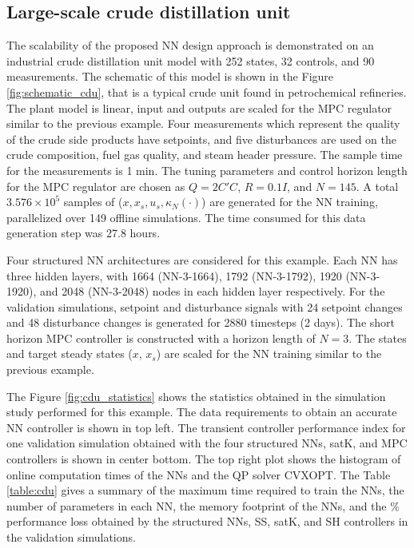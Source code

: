 \documentclass[preprint,5p, twocolumn, authoryear]{elsarticle}
\begin{document}
\subsection{Large-scale crude distillation unit}

The scalability of the proposed NN design 
approach is demonstrated on an industrial crude 
distillation unit model \citep*{pannocchia:rawlings:wright:2007} 
with 252 states, 32 controls, and 90 measurements. The 
schematic of this model is shown in the Figure \ref{fig:schematic_cdu}, 
that is a typical crude unit found in petrochemical refineries.
The plant model is linear, input and outputs are scaled 
for the MPC regulator similar to the previous example.
Four measurements which represent 
the quality of the crude side products have setpoints, 
and five disturbances are used on the crude composition, 
fuel gas quality, and steam header pressure. 
The sample time for the measurements is 1 min. The tuning 
parameters and control horizon length for the 
MPC regulator are chosen as $Q = 2C'C$, $R = 0.1I$, 
and $N = 145$. A total $3.576 \times 10^5$ 
samples of ($x, x_s, u_s, \kappa_N(\cdot)$)
are generated for the NN training, parallelized over 
149 offline simulations. The time consumed 
for this data generation step was 27.8 hours.

Four structured NN architectures 
are considered for this example. Each NN
has three hidden layers, with 
1664 (NN-3-1664), 1792 (NN-3-1792), 
1920 (NN-3-1920), and 2048 (NN-3-2048) 
nodes in each hidden layer respectively. 
For the validation simulations, 
setpoint and disturbance signals 
with 24 setpoint changes and 48 disturbance changes 
is generated for 2880 timesteps (2 days). 
The short horizon MPC controller is constructed with a 
horizon length of $N = 3$. 
The states and target steady states 
($x$, $x_s$) are scaled for the NN training
similar to the previous example.

The Figure \ref{fig:cdu_statistics} shows the 
statistics obtained in the simulation study performed for this 
example. The data requirements to obtain 
an accurate NN controller is shown in top left.
The transient controller performance index 
for one validation simulation
obtained with the four structured NNs,
satK, and MPC controllers is shown in center bottom.
The top right plot shows the 
histogram of online computation times 
of the NNs and the QP solver CVXOPT.
The Table \ref{table:cdu} gives a summary of 
the maximum time required to train the NNs, 
the number of parameters
in each NN, the memory footprint of the NNs, and 
the $\%$ performance loss obtained by 
the structured NNs, SS, satK, and SH 
controllers in the validation simulations. 
\end{document}
